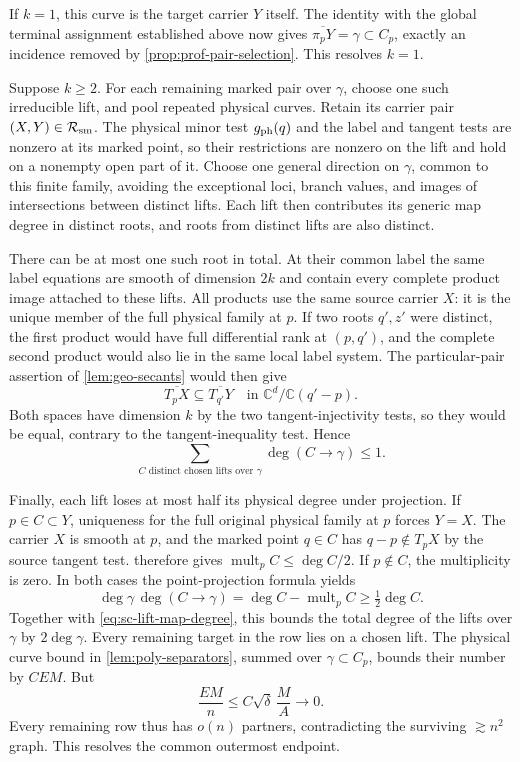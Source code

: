 If $k=1$, this curve is the target carrier $Y$ itself.  The identity with the global terminal assignment established above now gives $\overline{\pi_pY}=\gamma\subset C_p$, exactly an incidence removed by \cref{prop:prof-pair-selection}.  This resolves $k=1$.

Suppose $k\ge2$.  For each remaining marked pair over $\gamma$, choose one such irreducible lift, and pool repeated physical curves.  Retain its carrier pair $(X,Y)\in\mathcal{R}_{\rm sm}$.  The physical minor test $g_{\rm ph}(q)$ and the label and tangent tests are nonzero at its marked point, so their restrictions are nonzero on the lift and hold on a nonempty open part of it.  Choose one general direction on $\gamma$, common to this finite family, avoiding the exceptional loci, branch values, and images of intersections between distinct lifts.  Each lift then contributes its generic map degree in distinct roots, and roots from distinct lifts are also distinct.

There can be at most one such root in total.  At their common label the same label equations are smooth of dimension $2k$ and contain every complete product image attached to these lifts.  All products use the same source carrier $X$: it is the unique member of the full physical family at $p$.  If two roots $q',z'$ were distinct, the first product would have full differential rank at $(p,q')$, and the complete second product would also lie in the same local label system.  The particular-pair assertion of \cref{lem:geo-secants} would then give
\[
 \overline{T_pX}\subseteq\overline{T_{q'}Y}
 \quad\text{in }\mathbb{C}^d/\mathbb{C}(q'-p).
\]
Both spaces have dimension $k$ by the two tangent-injectivity tests, so they would be equal, contrary to the tangent-inequality test.  Hence
\begin{equation}\label{eq:sc-lift-map-degree}
 \sum_{C\text{ distinct chosen lifts over }\gamma}
       \deg(C\longrightarrow\gamma)\le1.
\end{equation}

Finally, each lift loses at most half its physical degree under projection. If $p\in C\subset Y$, uniqueness for the full original physical family at $p$ forces $Y=X$.  The carrier $X$ is smooth at $p$, and the marked point $q\in C$ has $q-p\notin T_pX$ by the source tangent test.  therefore gives $\operatorname{mult}_pC\le\deg C/2$.  If $p\notin C$, the multiplicity is zero.  In both cases the point-projection formula yields
\[
 \deg\gamma\,\deg(C\to\gamma)
 =\deg C-\operatorname{mult}_pC\ge\tfrac12\deg C.
\]
Together with \eqref{eq:sc-lift-map-degree}, this bounds the total degree of the lifts over $\gamma$ by $2\deg\gamma$.  Every remaining target in the row lies on a chosen lift.  The physical curve bound in \cref{lem:poly-separators}, summed over $\gamma\subset C_p$, bounds their number by $CEM$.  But
\[
 \frac{EM}{n}\le C\sqrt\delta\,\frac MA\longrightarrow0.
\]
Every remaining row thus has $o(n)$ partners, contradicting the surviving $\gtrsim n^2$ graph.  This resolves the common outermost endpoint.

